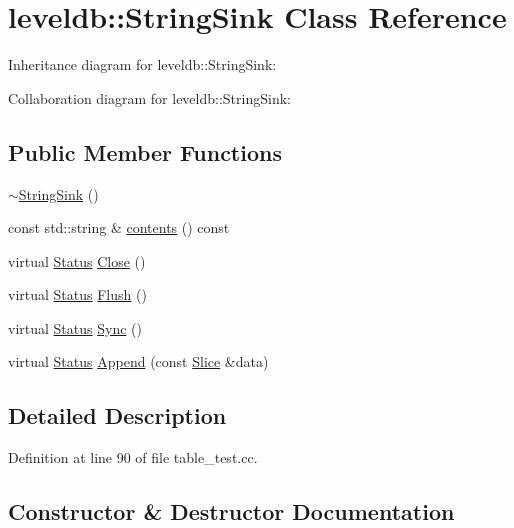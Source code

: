 \hypertarget{classleveldb_1_1_string_sink}{}\section{leveldb\+:\+:String\+Sink Class Reference}
\label{classleveldb_1_1_string_sink}


Inheritance diagram for leveldb\+:\+:String\+Sink\+:


Collaboration diagram for leveldb\+:\+:String\+Sink\+:
\subsection*{Public Member Functions}
\begin{DoxyCompactItemize}
\item 
\hyperlink{classleveldb_1_1_string_sink_a0cedd3ea3f2c0353f64c8e7509bc8107}{$\sim$\+String\+Sink} ()
\item 
const std\+::string \& \hyperlink{classleveldb_1_1_string_sink_ac6a122614f3a447d2633e5a5725a9613}{contents} () const 
\item 
virtual \hyperlink{classleveldb_1_1_status}{Status} \hyperlink{classleveldb_1_1_string_sink_a40e2142f8078720ecbad8a1d48be6f48}{Close} ()
\item 
virtual \hyperlink{classleveldb_1_1_status}{Status} \hyperlink{classleveldb_1_1_string_sink_af8dc901a44e89b56726bde2782a41ab7}{Flush} ()
\item 
virtual \hyperlink{classleveldb_1_1_status}{Status} \hyperlink{classleveldb_1_1_string_sink_a77f1f2b9797737fbd89211ba0bb9a93e}{Sync} ()
\item 
virtual \hyperlink{classleveldb_1_1_status}{Status} \hyperlink{classleveldb_1_1_string_sink_a10db68412947f16bde307677a663c241}{Append} (const \hyperlink{classleveldb_1_1_slice}{Slice} \&data)
\end{DoxyCompactItemize}


\subsection{Detailed Description}


Definition at line 90 of file table\+\_\+test.\+cc.



\subsection{Constructor \& Destructor Documentation}
\hypertarget{classleveldb_1_1_string_sink_a0cedd3ea3f2c0353f64c8e7509bc8107}{}
